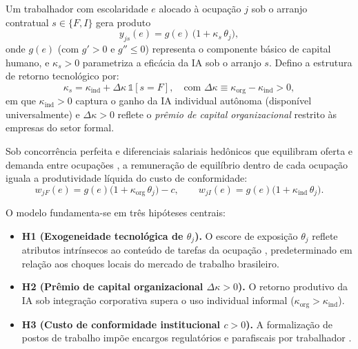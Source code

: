 Um trabalhador com escolaridade $e$ alocado à ocupação $j$ sob o arranjo contratual $s \in \{F, I\}$ gera produto
\begin{equation}
    y_{j s}(e) = g(e) \, \big(1 + \kappa_s \, \theta_j\big),
    \label{eq:produto}
\end{equation}
onde $g(e)$ (com $g' > 0$ e $g'' \le 0$) representa o componente básico de capital humano, e $\kappa_s > 0$ parametriza a eficácia da IA sob o arranjo $s$. Defino a estrutura de retorno tecnológico por:
\begin{equation}
    \kappa_s = \kappa_{\text{ind}} + \Delta\kappa \, \mathbb{1}[s = F],
    \quad \text{com } \Delta\kappa \equiv \kappa_{\text{org}} - \kappa_{\text{ind}} > 0,
\end{equation}
em que $\kappa_{\text{ind}} > 0$ captura o ganho da IA individual autônoma (disponível universalmente) e $\Delta\kappa > 0$ reflete o \emph{prêmio de capital organizacional} restrito às empresas do setor formal.

Sob concorrência perfeita e diferenciais salariais hedônicos que equilibram oferta e demanda entre ocupações \citep{rosen1986theory,costinot2010matching}, a remuneração de equilíbrio dentro de cada ocupação iguala a produtividade líquida do custo de conformidade:
\begin{equation}
    w_{jF}(e) = g(e)\big(1 + \kappa_{\text{org}}\,\theta_j\big) - c,
    \qquad w_{jI}(e) = g(e)\big(1 + \kappa_{\text{ind}}\,\theta_j\big).
    \label{eq:salarios}
\end{equation}

\noindent O modelo fundamenta-se em três hipóteses centrais:
\begin{itemize}
    \item \textbf{H1 (Exogeneidade tecnológica de $\theta_j$).} O escore de exposição $\theta_j$ reflete atributos intrínsecos ao conteúdo de tarefas da ocupação \citep{eloundou2024gpts}, predeterminado em relação aos choques locais do mercado de trabalho brasileiro.
    \item \textbf{H2 (Prêmio de capital organizacional $\Delta\kappa > 0$).} O retorno produtivo da IA sob integração corporativa supera o uso individual informal ($\kappa_{\text{org}} > \kappa_{\text{ind}}$).
    \item \textbf{H3 (Custo de conformidade institucional $c > 0$).} A formalização de postos de trabalho impõe encargos regulatórios e parafiscais por trabalhador \citep{ulyssea2018firms}.
\end{itemize}

